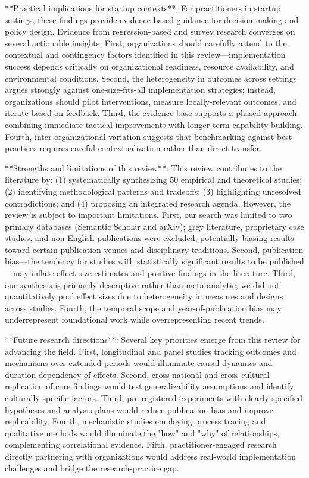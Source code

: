 \documentclass[11pt, a4paper]{article}
\begin{document}
**Practical implications for startup contexts**: For practitioners in startup settings, these findings provide evidence-based guidance for decision-making and policy design. Evidence from regression-based and survey research converges on several actionable insights. First, organizations should carefully attend to the contextual and contingency factors identified in this review—implementation success depends critically on organizational readiness, resource availability, and environmental conditions. Second, the heterogeneity in outcomes across settings argues strongly against one-size-fits-all implementation strategies; instead, organizations should pilot interventions, measure locally-relevant outcomes, and iterate based on feedback. Third, the evidence base supports a phased approach combining immediate tactical improvements with longer-term capability building. Fourth, inter-organizational variation suggests that benchmarking against best practices requires careful contextualization rather than direct transfer.

**Strengths and limitations of this review**: This review contributes to the literature by: (1) systematically synthesizing 50 empirical and theoretical studies; (2) identifying methodological patterns and tradeoffs; (3) highlighting unresolved contradictions; and (4) proposing an integrated research agenda. However, the review is subject to important limitations. First, our search was limited to two primary databases (Semantic Scholar and arXiv); grey literature, proprietary case studies, and non-English publications were excluded, potentially biasing results toward certain publication venues and disciplinary traditions. Second, publication bias—the tendency for studies with statistically significant results to be published—may inflate effect size estimates and positive findings in the literature. Third, our synthesis is primarily descriptive rather than meta-analytic; we did not quantitatively pool effect sizes due to heterogeneity in measures and designs across studies. Fourth, the temporal scope and year-of-publication bias may underrepresent foundational work while overrepresenting recent trends.

**Future research directions**: Several key priorities emerge from this review for advancing the field. First, longitudinal and panel studies tracking outcomes and mechanisms over extended periods would illuminate causal dynamics and duration-dependency of effects. Second, cross-national and cross-cultural replication of core findings would test generalizability assumptions and identify culturally-specific factors. Third, pre-registered experiments with clearly specified hypotheses and analysis plans would reduce publication bias and improve replicability. Fourth, mechanistic studies employing process tracing and qualitative methods would illuminate the "how" and "why" of relationships, complementing correlational evidence. Fifth, practitioner-engaged research directly partnering with organizations would address real-world implementation challenges and bridge the research-practice gap.



\end{document}
